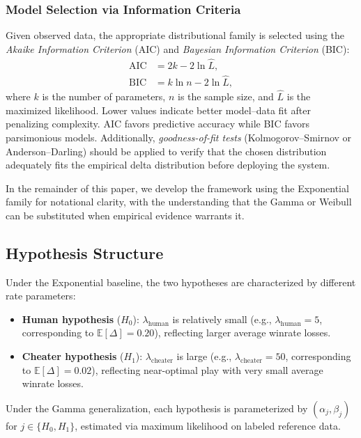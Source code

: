 \documentclass[11pt,a4paper]{article}
\newcommand{\E}{\mathbb{E}}
\begin{document}
\subsubsection{Model Selection via Information Criteria}
\label{sec:model_selection}

Given observed data, the appropriate distributional family is selected using
the \emph{Akaike Information Criterion} (AIC) and \emph{Bayesian Information
Criterion} (BIC):
\begin{align}
    \text{AIC} &= 2k - 2\ln \hat{L}, \label{eq:aic}\\
    \text{BIC} &= k \ln n - 2\ln \hat{L}, \label{eq:bic}
\end{align}
where $k$ is the number of parameters, $n$ is the sample size, and
$\hat{L}$ is the maximized likelihood. Lower values indicate better
model--data fit after penalizing complexity. AIC favors predictive accuracy
while BIC favors parsimonious models. Additionally,
\emph{goodness-of-fit tests} (Kolmogorov--Smirnov or Anderson--Darling) should
be applied to verify that the chosen distribution adequately fits the
empirical delta distribution before deploying the system.

In the remainder of this paper, we develop the framework using the
Exponential family for notational clarity, with the understanding that
the Gamma or Weibull can be substituted when empirical evidence warrants it.

\subsection{Hypothesis Structure}

Under the Exponential baseline, the two hypotheses are characterized by
different rate parameters:
\begin{itemize}
    \item \textbf{Human hypothesis} ($H_0$): $\lambda_{\text{human}}$ is
          relatively small (e.g., $\lambda_{\text{human}} = 5$, corresponding to
          $\E[\Delta] = 0.20$), reflecting larger average winrate losses.
    \item \textbf{Cheater hypothesis} ($H_1$): $\lambda_{\text{cheater}}$ is
          large (e.g., $\lambda_{\text{cheater}} = 50$, corresponding to
          $\E[\Delta] = 0.02$), reflecting near-optimal play with very small
          average winrate losses.
\end{itemize}

Under the Gamma generalization, each hypothesis is parameterized by
$(\alpha_j, \beta_j)$ for $j \in \{H_0, H_1\}$, estimated via
maximum likelihood on labeled reference data.
\end{document}
